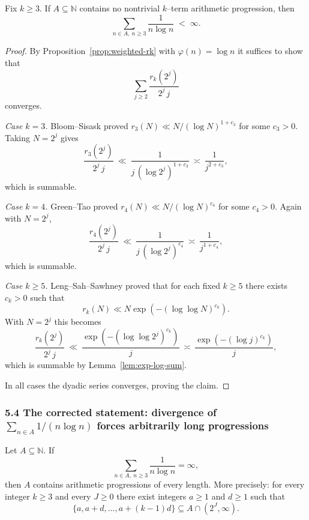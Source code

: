 \begin{theorem}
\label{thm:log-weighted-finite}
Fix $k\ge 3$. If $A\subseteq\mathbb{N}$ contains no nontrivial $k$--term arithmetic progression, then
\[
\sum_{n\in A,\ n\ge 3}\frac{1}{n\log n}\;<\;\infty.
\]
\end{theorem}

\begin{proof}
By Proposition~\ref{prop:weighted-rk} with $\varphi(n)=\log n$ it suffices to show that
\[
\sum_{j\ge 2}\frac{r_k(2^j)}{2^j\,j}
\]
converges.

\medskip
\noindent\emph{Case $k=3$.}
Bloom--Sisask proved $r_3(N)\ll N/(\log N)^{1+c_3}$ for some $c_3>0$. Taking $N=2^j$ gives
\[
\frac{r_3(2^j)}{2^j\,j}\ \ll\ \frac{1}{j\,(\log 2^j)^{1+c_3}}\ \asymp\ \frac{1}{j^{2+c_3}},
\]
which is summable.

\medskip
\noindent\emph{Case $k=4$.}
Green--Tao proved $r_4(N)\ll N/(\log N)^{c_4}$ for some $c_4>0$. Again with $N=2^j$,
\[
\frac{r_4(2^j)}{2^j\,j}\ \ll\ \frac{1}{j\,(\log 2^j)^{c_4}}\ \asymp\ \frac{1}{j^{1+c_4}},
\]
which is summable.

\medskip
\noindent\emph{Case $k\ge 5$.}
Leng--Sah--Sawhney proved that for each fixed $k\ge 5$ there exists $c_k>0$ such that
\[
r_k(N)\ll N\exp(- (\log\log N)^{c_k}).
\]
With $N=2^j$ this becomes
\[
\frac{r_k(2^j)}{2^j\,j}
\ \ll\ \frac{\exp(- (\log\log 2^j)^{c_k})}{j}
\ \asymp\ \frac{\exp(- (\log j)^{c_k})}{j},
\]
which is summable by Lemma~\ref{lem:exp-log-sum}.

In all cases the dyadic series converges, proving the claim.
\end{proof}

\subsubsection{5.4 The corrected statement: divergence of $\sum_{n\in A}1/(n\log n)$ forces arbitrarily long progressions}

\begin{theorem}
\label{thm:log-weighted-erdos}
Let $A\subseteq\mathbb{N}$. If
\[
\sum_{n\in A,\ n\ge 3}\frac{1}{n\log n}=\infty,
\]
then $A$ contains arithmetic progressions of every length. More precisely: for every integer $k\ge 3$ and every $J\ge 0$ there exist integers $a\ge 1$ and $d\ge 1$ such that
\[
\{a,a+d,\dots,a+(k-1)d\}\subseteq A\cap(2^J,\infty).
\]
\end{theorem}

